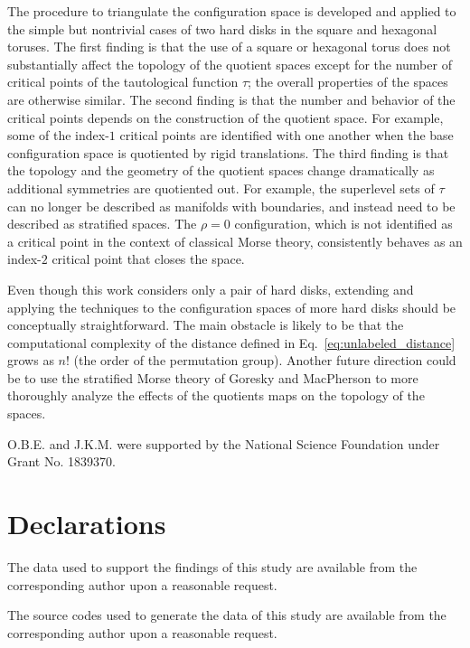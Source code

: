 \documentclass[default,iicol]{sn-jnl}%
\theoremstyle{thmstyleone}%
\theoremstyle{thmstyletwo}%
\theoremstyle{thmstylethree}%
\begin{document}
The procedure to triangulate the configuration space is developed and applied to the simple but nontrivial cases of two hard disks in the square and hexagonal toruses. The first finding is that the use of a square or hexagonal torus does not substantially affect the topology of the quotient spaces except for the number of critical points of the tautological function $\tau$; the overall properties of the spaces are otherwise similar. The second finding is that the number and behavior of the critical points depends on the construction of the quotient space. For example, some of the index-$1$ critical points are identified with one another when the base configuration space is quotiented by rigid translations. The third finding is that the topology and the geometry of the quotient spaces change dramatically as additional symmetries are quotiented out. For example, the superlevel sets of $\tau$ can no longer be described as manifolds with boundaries, and instead need to be described as stratified spaces. The $\rho = 0$ configuration, which is not identified as a critical point in the context of classical Morse theory, consistently behaves as an index-$2$ critical point that closes the space.

Even though this work considers only a pair of hard disks, extending and applying the techniques to the configuration spaces of more hard disks should be conceptually straightforward. The main obstacle is likely to be that the computational complexity of the distance defined in Eq.\ \ref{eq:unlabeled_distance} grows as $n!$ (the order of the permutation group). Another future direction could be to use the stratified Morse theory of Goresky and MacPherson \cite{goresky1988stratified} to more thoroughly analyze the effects of the quotients maps on the topology of the spaces.

\backmatter
{} O.B.E. and J.K.M. were  supported  by  the  National  Science  Foundation under Grant No. 1839370.

\section*{Declarations}

 The data used to support the findings of this study are available from the corresponding author upon a reasonable request.

 The source codes used to generate the data of this study are available from the corresponding author upon a reasonable request.
\end{document}
